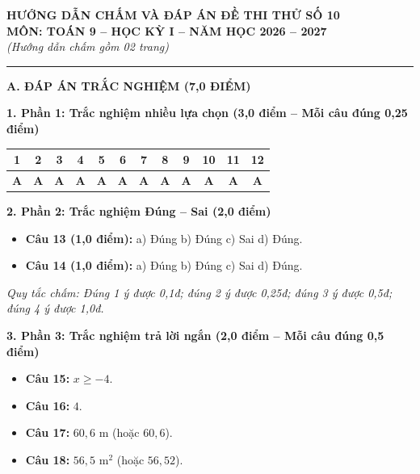 \documentclass[11pt,a4paper]{article}
\begin{document}
\begin{center}
\textbf{\large HƯỚNG DẪN CHẤM VÀ ĐÁP ÁN ĐỀ THI THỬ SỐ 10}\\
\textbf{MÔN: TOÁN 9 -- HỌC KỲ I -- NĂM HỌC 2026 -- 2027}\\
\textit{(Hướng dẫn chấm gồm 02 trang)}
\end{center}

\vspace{1mm}
\noindent
\rule{\linewidth}{0.8pt}

\vspace{1.5mm}
\noindent
\textbf{\large A. ĐÁP ÁN TRẮC NGHIỆM (7,0 ĐIỂM)}

\vspace{1.5mm}
\noindent
\textbf{1. Phần 1: Trắc nghiệm nhiều lựa chọn (3,0 điểm -- Mỗi câu đúng 0,25 điểm)}
\begin{center}
\begin{tabular}{|c|c|c|c|c|c|c|c|c|c|c|c|}
\hline
\textbf{1} & \textbf{2} & \textbf{3} & \textbf{4} & \textbf{5} & \textbf{6} & \textbf{7} & \textbf{8} & \textbf{9} & \textbf{10} & \textbf{11} & \textbf{12} \\
\hline
\textbf{A} & \textbf{A} & \textbf{A} & \textbf{A} & \textbf{A} & \textbf{A} & \textbf{A} & \textbf{A} & \textbf{A} & \textbf{A} & \textbf{A} & \textbf{A} \\
\hline
\end{tabular}
\end{center}

\vspace{1.5mm}
\noindent
\textbf{2. Phần 2: Trắc nghiệm Đúng -- Sai (2,0 điểm)}
\begin{itemize}
  \item \textbf{Câu 13 (1,0 điểm):} a) Đúng \quad b) Đúng \quad c) Sai \quad d) Đúng.
  \item \textbf{Câu 14 (1,0 điểm):} a) Đúng \quad b) Đúng \quad c) Sai \quad d) Đúng.
\end{itemize}
\textit{Quy tắc chấm: Đúng 1 ý được 0,1đ; đúng 2 ý được 0,25đ; đúng 3 ý được 0,5đ; đúng 4 ý được 1,0đ.}

\vspace{1.5mm}
\noindent
\textbf{3. Phần 3: Trắc nghiệm trả lời ngắn (2,0 điểm -- Mỗi câu đúng 0,5 điểm)}
\begin{itemize}
  \item \textbf{Câu 15:} $x \ge -4$.
  \item \textbf{Câu 16:} $4$.
  \item \textbf{Câu 17:} $60{,}6\text{ m}$ (hoặc $60{,}6$).
  \item \textbf{Câu 18:} $56{,}5\text{ m}^2$ (hoặc $56{,}52$).
\end{itemize}
\end{document}
